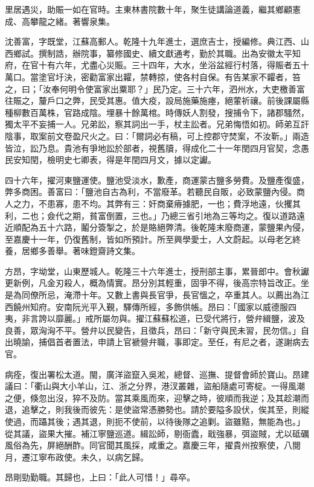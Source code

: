 \begin{pinyinscope}
里居遇災，助賑一如在官時。主東林書院數十年，聚生徒講論道義，繼其鄉顧憲成、高攀龍之緒。著響泉集。

沈善富，字既堂，江蘇高郵人。乾隆十九年進士，選庶吉士，授編修。典江西、山西鄉試。撰制誥，辦院事，纂修國史、續文獻通考，勤於其職。出為安徽太平知府，在官十有六年，尤盡心災賑。三十四年，大水，坐浴盆經行村落，得賑者五十萬口。當塗官圩決，密勸富家出糶，禁轉掠，使各村自保。有告某家不糶者，笞之，曰；「汝奉何明令使富家出粟耶？」民乃定。三十六年，泗州水，大吏檄善富往賑之，釐戶口之弊，民受其惠。值大疫，設局施藥施瘞，絕葷祈禳。前後課屬縣種柳數百萬株，官路成陰。埋暴十餘萬棺。時傳妖人割發，搜捕令下，諸郡騷然，獨太平不妄捕一人。兄弟訟，察其詞出一手，杖主訟者。兄弟悔悟如初。師弟互訐陰事，取案前文卷盈尺火之。曰：「爾詞必有稿，可上控郡守焚案，不汝靳。」兩造皆泣，訟乃息。貴池有爭地訟於部者，視舊牘，得成化二十一年閏四月官契，念愚民安知閏，檢明史七卿表，得是年閏四月文，據以定讞。

四十六年，擢河東鹽運使。鹽池受淡水，歉產，商運蒙古鹽多勞費。及鹽產復盛，弊多商困。善富曰：「鹽池自古為利，不當廢革。若聽民自販，必致蒙鹽內侵。商人之力，不患寡，患不均。其弊有三：奸商棄瘠據肥，一也；費浮地遠，伙攫其利，二也；僉代之期，貧富倒置，三也。」乃總三省引地為三等均之。復以道路遠近順配為五十六路，鬮分簽掣之，於是賂絕弊清。後乾隆末廢商運，蒙鹽果內侵，至嘉慶十一年，仍復舊制，皆如所預計。所至興學愛士，人文蔚起。以母老乞終養，居鄉多善舉。著味鐙齋詩文集。

方昂，字坳堂，山東歷城人。乾隆三十六年進士，授刑部主事，累晉郎中。會秋讞更新例，凡金刃殺人，概為情實。昂分別其輕重，固爭不得，後高宗特旨改正。坐是為同僚所忌，淹滯十年。又數上書與長官爭，長官慍之，卒重其人。以薦出為江西饒州知府。安南阮光平入覲，驛傳所經，多飾供帳。昂曰：「國家以威德服四夷，非言誇以靡麗。」戒所屬勿與。擢江蘇蘇松道，已受代將行，營弁緝鹽，波及良善，眾洶洶不平。營弁以民變告，且徵兵，昂曰：「新守與民未習，民勿信。」自出曉諭，捕倡首者置法，申請上官褫營弁職，事即定。至任，有尼之者，遂謝病去官。

病痊，復出署松太道。閩，廣洋盜竄入吳淞，總督、巡撫、提督會師於寶山。昂建議曰：「衢山與大小羊山，江、浙之分界，港汊叢雜，盜船隨處可寄椗。一得風潮之便，倏忽出沒，猝不及防。當其乘風而來，迎擊之時，彼順而我逆；及其趁潮而退，追擊之，則我後而彼先：是使盜常憑勝勢也。請於要隘多設伏，俟其至，則縱使過，而躡其後；遇其退，則扼不使前，以待後隊之追剿。盜雖黠，無能為也。」從其議，盜果大摧。補江寧鹽巡道。緝訟師，剔衙蠹，戢強暴，弭盜賊，尤以砥礪風俗為先，屏絕酬酢。同官聞其風採，咸重之。嘉慶三年，擢貴州按察使，八閱月，遷江寧布政使。未久，以病乞歸。

昂剛勁勤職。其歸也，上曰：「此人可惜！」尋卒。


\end{pinyinscope}
